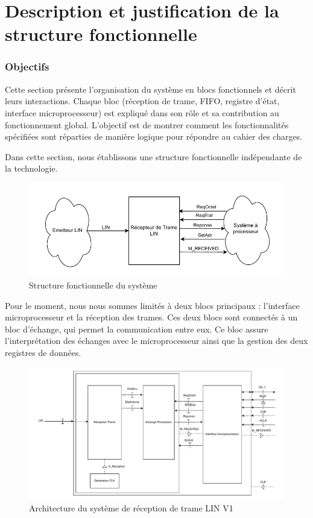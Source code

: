 \section{Description et justification de la structure fonctionnelle}

\subsubsection*{Objectifs}

Cette section présente l'organisation du système en blocs fonctionnels et décrit leurs 
interactions. Chaque bloc (réception de trame, FIFO, registre d'état, interface microprocesseur) 
est expliqué dans son rôle et sa contribution au fonctionnement global. L'objectif est de montrer 
comment les fonctionnalités spécifiées sont réparties de manière logique pour répondre au cahier 
des charges.
\newline

Dans cette section, nous établissons une structure fonctionnelle indépendante de la technologie.

\begin{figure}[H]
    \centering
    \includegraphics[width=0.8\linewidth]{images/inter/Structure_Fonc_Circuit.pdf}
    \caption{Structure fonctionnelle du système}
    \label{fig:placeholder}
\end{figure}

Pour le moment, nous nous sommes limités à deux blocs principaux : l'interface microprocesseur et 
la réception des trames. Ces deux blocs sont connectés à un bloc d'échange, qui permet la 
communication entre eux. Ce bloc assure l'interprétation des échanges avec le microprocesseur ainsi 
que la gestion des deux registres de données.
\newline

\begin{figure}[H]
    \centering
    \includegraphics[width=0.8\linewidth]{images/inter/Schema_base_circuit.pdf}
    \caption{Architecture du système de réception de trame LIN V1}
    \label{fig:placeholder}
\end{figure}

